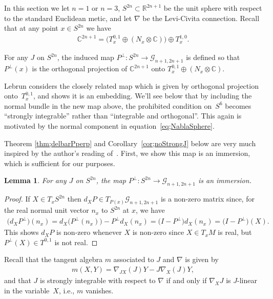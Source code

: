 \documentclass[10pt,a4paper]{amsart}
\newtheorem{lem}[thm]{Lemma}
\numberwithin{equation}{section}
\newcommand{\R}{\mathbb{R}}
\newcommand{\CC}{\mathbb{C}}
\newcommand{\cG}{{\mathcal G}}
\begin{document}
In this section we let $n=1$ or $n=3$, $S^{2n} \subset \R^{2n+1}$ be the unit sphere with respect to the standard Euclidean metic, and let $\nabla$ be the Levi-Civita connection. Recall that at any point $x \in S^{2n}$ we have
\begin{gather*}
\CC^{2n+1} = \big( T^{0,1}_x \oplus (N_x \otimes \CC) \big) \oplus T^{1,0}_x.
\end{gather*}

\begin{defn}For any $J$ on $S^{2n}$, the induced map $P^\perp\colon S^{2n} \to \cG_{n+1,2n+1}$ is defined so that~$P^\perp(x)$ is the orthogonal projection of $\CC^{2n+1}$ onto $T^{0,1}_x \oplus (N_x \otimes \CC)$.
\end{defn}

Lebrun \cite{L} considers the closely related map which is given by orthogonal projection onto~$T^{0,1}_x$, and shows it is an embedding. We'll see below that by including the normal bundle in the new map above, the prohibited condition on~$S^6$ becomes ``strongly integrable'' rather than ``integrable and orthogonal''. This again is motivated by the normal component in equation~\eqref{eq;NablaSphere}.

Theorem \ref{thm;delbarPperp} and Corollary~\ref{cor;noStrongJ} below are very much inspired by the author's reading of~\cite{L}. First, we show this map is an immersion, which is sufficient for our purposes.

\begin{lem} For any $J$ on $S^{2n}$, the map $P^\perp\colon S^{2n} \to \cG_{n+1,2n+1}$ is an immersion.
\end{lem}

\begin{proof}If $X \in T_x S^{2n}$ then $d_X P \in T_{P(x)} \cG_{n+1,2n+1}$ is a non-zero matrix since, for the real normal unit vector $n_x$ to $S^{2n}$ at $x$, we have
\begin{gather*}
\big(d_XP^\perp\big)(n_x) = d_X\big(P^\perp(n_x)\big) - P^\perp d_X(n_x) = \big(I-P^\perp \big) d_X(n_x) = \big(I-P^\perp\big)(X).
\end{gather*}
This shows $d_X P$ is non-zero whenever $X$ is non-zero since $X \in T_xM$ is real, but $P^\perp(X) \in T^{0,1}$ is not real.
\end{proof}

Recall that the tangent algebra $m$ associated to $J$ and $\nabla$ is given by
\begin{gather*}
m(X,Y) = \nabla_{JX} (J)Y - J \nabla_X (J) Y,
\end{gather*}
and that $J $ is strongly integrable with respect to $\nabla$ if and only if $\nabla_X J$ is $J$-linear in the variable~$X$, i.e., $m$ vanishes.
\end{document}
